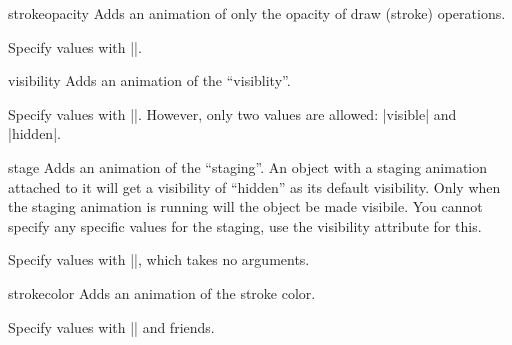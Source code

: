 \begin{sysanimateattribute}{strokeopacity}
  Adds an animation of only the opacity of draw (stroke) operations.
  
  Specify values with |\pgfsys@animation@val@scalar|.
  
\begin{codeexample}[width=2cm]
\end{codeexample}
\end{sysanimateattribute}

\begin{sysanimateattribute}{visibility}
  Adds an animation of the ``visiblity''.
  
  Specify values with |\pgfsys@animation@val@text|. However, only two values are allowed:
  |visible| and |hidden|.
\begin{codeexample}[width=2cm]
\end{codeexample}
\end{sysanimateattribute}

\begin{sysanimateattribute}{stage}
  Adds an animation of the ``staging''. An object with a staging
  animation attached to it will get a visibility of ``hidden'' as its
  default visibility. Only when the staging animation is running will
  the object be made visibile. You cannot specify any specific values
  for the staging, use the visibility attribute for this.
  
  Specify values with |\pgfsys@animation@val|, which takes no arguments.
\begin{codeexample}[width=4cm]
\end{codeexample}
\end{sysanimateattribute}

\begin{sysanimateattribute}{strokecolor}
  Adds an animation of the stroke color.

  Specify values with |\pgfsys@animation@val@color@rgb| and friends.
\begin{codeexample}[width=2cm]
\end{codeexample}
\end{sysanimateattribute}

